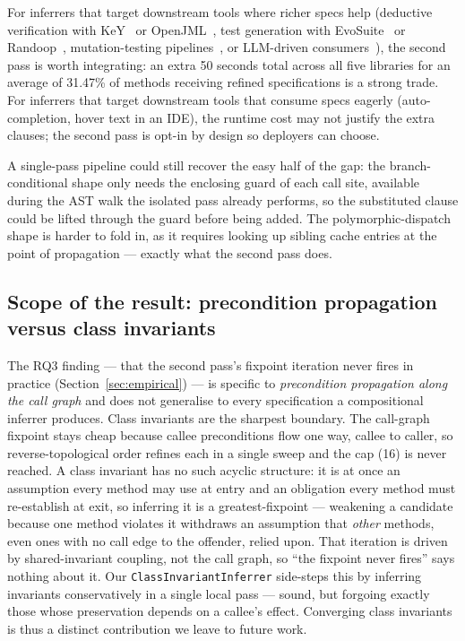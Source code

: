 For inferrers that target downstream tools where richer specs help (deductive verification with KeY~\cite{key2016book} or OpenJML~\cite{openjml}, test generation with EvoSuite~\cite{fraser2011evosuite} or Randoop~\cite{pacheco2007randoop}, mutation-testing pipelines~\cite{coles2016pitest,papadakis2019mutation}, or LLM-driven consumers~\cite{schafer2023adaptive,lemieux2023codamosa,kang2023libro}), the second pass is worth integrating: an extra 50 seconds total across all five libraries for an average of 31.47\% of methods receiving refined specifications is a strong trade. For inferrers that target downstream tools that consume
specs eagerly (auto-completion, hover text in an IDE), the
runtime cost may not justify the extra clauses; the second pass
is opt-in by design so deployers can choose.

A single-pass pipeline could still recover the easy half of the
gap: the branch-conditional shape only needs the enclosing guard of
each call site, available during the AST walk the isolated pass
already performs, so the substituted clause could be lifted through
the guard before being added. The polymorphic-dispatch shape is
harder to fold in, as it requires looking up sibling cache entries at
the point of propagation --- exactly what the second pass does.

\subsection{Scope of the result: precondition propagation versus class invariants}
\label{sec:scope-invariants}

The RQ3 finding --- that the second pass's fixpoint iteration never
fires in practice (Section~\ref{sec:empirical}) --- is specific to
\emph{precondition propagation along the call graph} and does not
generalise to every specification a compositional inferrer produces.
Class invariants are the sharpest boundary. The call-graph fixpoint
stays cheap because callee preconditions flow one way, callee to
caller, so reverse-topological order refines each in a single sweep
and the cap (16) is never reached. A class invariant has no such
acyclic structure: it is at once an assumption every method may use
at entry and an obligation every method must re-establish at exit, so
inferring it is a greatest-fixpoint --- weakening a candidate because
one method violates it withdraws an assumption that \emph{other}
methods, even ones with no call edge to the offender, relied upon.
That iteration is driven by shared-invariant coupling, not the call
graph, so ``the fixpoint never fires'' says nothing about it. Our
\texttt{ClassInvariantInferrer} side-steps this by inferring
invariants conservatively in a single local pass --- sound, but
forgoing exactly those whose preservation depends on a callee's
effect. Converging class invariants is thus a distinct contribution
we leave to future work.

